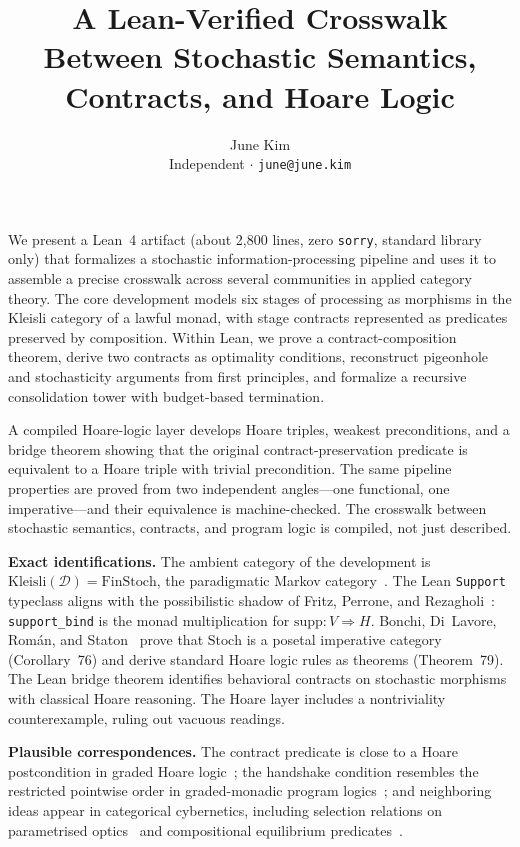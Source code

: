 \documentclass[11pt,a4paper]{article}
\title{A Lean-Verified Crosswalk Between Stochastic Semantics,\\Contracts, and Hoare Logic}
\author{June Kim\\{\small Independent $\cdot$ \texttt{june@june.kim}}}
\date{}
\begin{document}
\maketitle
\thispagestyle{empty}

\noindent
We present a Lean~4 artifact (about 2,800 lines, zero \texttt{sorry}, standard library only) that formalizes a stochastic information-processing pipeline and uses it to assemble a precise crosswalk across several communities in applied category theory. The core development models six stages of processing as morphisms in the Kleisli category of a lawful monad, with stage contracts represented as predicates preserved by composition. Within Lean, we prove a contract-composition theorem, derive two contracts as optimality conditions, reconstruct pigeonhole and stochasticity arguments from first principles, and formalize a recursive consolidation tower with budget-based termination.

A compiled Hoare-logic layer develops Hoare triples, weakest preconditions, and a bridge theorem showing that the original contract-preservation predicate is equivalent to a Hoare triple with trivial precondition. The same pipeline properties are proved from two independent angles---one functional, one imperative---and their equivalence is machine-checked. The crosswalk between stochastic semantics, contracts, and program logic is compiled, not just described.

\medskip\noindent\textbf{Exact identifications.}
The ambient category of the development is $\mathrm{Kleisli}(\mathcal{D}) = \mathrm{FinStoch}$, the paradigmatic Markov category~\cite{Fritz2020}. The Lean \texttt{Support} typeclass aligns with the possibilistic shadow of Fritz, Perrone, and Rezagholi~\cite{FPR2021}: \texttt{support\_bind} is the monad multiplication for $\mathrm{supp} : V \Rightarrow H$. Bonchi, Di~Lavore, Rom\'an, and Staton~\cite{BDRS2025} prove that $\mathrm{Stoch}$ is a posetal imperative category (Corollary~76) and derive standard Hoare logic rules as theorems (Theorem~79). The Lean bridge theorem identifies behavioral contracts on stochastic morphisms with classical Hoare reasoning. The Hoare layer includes a nontriviality counterexample, ruling out vacuous readings.

\medskip\noindent\textbf{Plausible correspondences.}
The contract predicate is close to a Hoare postcondition in graded Hoare logic~\cite{GKOS2021}; the handshake condition resembles the restricted pointwise order in graded-monadic program logics~\cite{KGSU2026}; and neighboring ideas appear in categorical cybernetics, including selection relations on parametrised optics~\cite{CGHR2021} and compositional equilibrium predicates~\cite{GKLF2020}.
\end{document}
